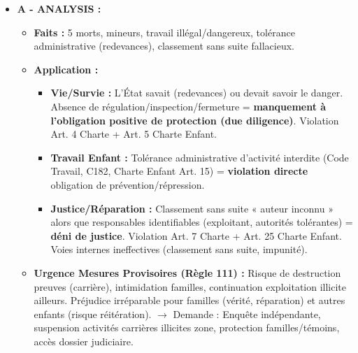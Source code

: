 \documentclass[11pt]{article}
\begin{document}
\begin{exoresolu}
\begin{itemize}
\begin{itemize}
                \item Art. 15 Charte Enfant : Protection contre exploitation économique/travail dangereux.
                \item Art. 7 Charte Africaine + Art. 25 Charte Enfant : Droit à un procès équitable / recours effectif.
                \item Jurisprudence Commission : \textit{Commission Nationale des Droits de l'Homme et des Libertés c. Tchad} (obligation protéger), \textit{Institute for Human Rights and Development in Africa c. Angola} (due diligence), \textit{Minority Rights Group c. Kenya} (peuples autochtones/environnement).
                \item Règle 111 Règlement Intérieur : Mesures provisoires pour éviter préjudice irréparable.
            \end{itemize}
        \item \textbf{A - ANALYSIS :}
            \begin{itemize}
                \item \textbf{Faits :} 5 morts, mineurs, travail illégal/dangereux, tolérance administrative (redevances), classement sans suite fallacieux.
                \item \textbf{Application :}
                    \begin{itemize}
                        \item \textbf{Vie/Survie :} L'État savait (redevances) ou devait savoir le danger. Absence de régulation/inspection/fermeture = \textbf{manquement à l'obligation positive de protection (due diligence)}. Violation Art. 4 Charte + Art. 5 Charte Enfant.
                        \item \textbf{Travail Enfant :} Tolérance administrative d'activité interdite (Code Travail, C182, Charte Enfant Art. 15) = \textbf{violation directe} obligation de prévention/répression.
                        \item \textbf{Justice/Réparation :} Classement sans suite « auteur inconnu » alors que responsables identifiables (exploitant, autorités tolérantes) = \textbf{déni de justice}. Violation Art. 7 Charte + Art. 25 Charte Enfant. Voies internes ineffectives (classement sans suite, impunité).
                    \end{itemize}
                \item \textbf{Urgence Mesures Provisoires (Règle 111) :} Risque de destruction preuves (carrière), intimidation familles, continuation exploitation illicite ailleurs. Préjudice irréparable pour familles (vérité, réparation) et autres enfants (risque réitération). $\rightarrow$ Demande : Enquête indépendante, suspension activités carrières illicites zone, protection familles/témoins, accès dossier judiciaire.

\end{itemize}
\end{itemize}
\end{exoresolu}
\end{document}
